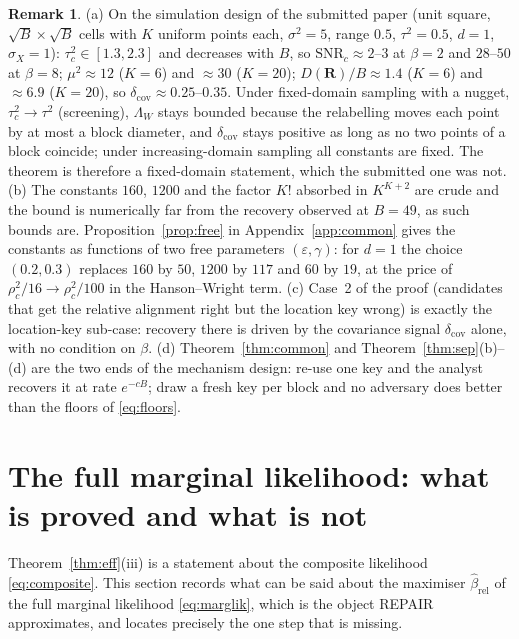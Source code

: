 \documentclass[11pt]{article}
\theoremstyle{definition}
\newtheorem{remark}{Remark}
\newcommand{\bR}{\mathbf{R}}
\newcommand{\rel}{\mathrm{rel}}
\begin{document}
\begin{remark}\label{rem:common}
(a) On the simulation design of the submitted paper (unit square, $\sqrt B\times\sqrt B$ cells with $K$ uniform points each, $\sigma^2=5$, range $0.5$, $\tau^2=0.5$, $d=1$, $\sigma_X=1$): $\tau_c^2\in[1.3,2.3]$ and decreases with $B$, so $\mathrm{SNR}_c\approx2$--$3$ at $\beta=2$ and $28$--$50$ at $\beta=8$; $\mu^2\approx12$ ($K=6$) and $\approx30$ ($K=20$); $D(\bR)/B\approx1.4$ ($K=6$) and $\approx6.9$ ($K=20$), so $\delta_{\mathrm{cov}}\approx0.25$--$0.35$. Under fixed-domain sampling with a nugget, $\tau_c^2\to\tau^2$ (screening), $\Lambda_W$ stays bounded because the relabelling moves each point by at most a block diameter, and $\delta_{\mathrm{cov}}$ stays positive as long as no two points of a block coincide; under increasing-domain sampling all constants are fixed. The theorem is therefore a fixed-domain statement, which the submitted one was not.
(b) The constants $160$, $1200$ and the factor $K!$ absorbed in $K^{K+2}$ are crude and the bound is numerically far from the recovery observed at $B=49$, as such bounds are. Proposition~\ref{prop:free} in Appendix~\ref{app:common} gives the constants as functions of two free parameters $(\varepsilon,\gamma)$: for $d=1$ the choice $(0.2,0.3)$ replaces $160$ by $50$, $1200$ by $117$ and $60$ by $19$, at the price of $\rho_c^2/16\to\rho_c^2/100$ in the Hanson--Wright term.
(c) Case~2 of the proof (candidates that get the relative alignment right but the location key wrong) is exactly the location-key sub-case: recovery there is driven by the covariance signal $\delta_{\mathrm{cov}}$ alone, with no condition on $\beta$.
(d) Theorem~\ref{thm:common} and Theorem~\ref{thm:sep}(b)--(d) are the two ends of the mechanism design: re-use one key and the analyst recovers it at rate $e^{-cB}$; draw a fresh key per block and no adversary does better than the floors of \eqref{eq:floors}.
\end{remark}

\section{The full marginal likelihood: what is proved and what is not}\label{sec:full}

Theorem~\ref{thm:eff}(iii) is a statement about the composite likelihood \eqref{eq:composite}. This section records what can be said about the maximiser $\hat\beta_\rel$ of the full marginal likelihood \eqref{eq:marglik}, which is the object REPAIR approximates, and locates precisely the one step that is missing.
\end{document}
